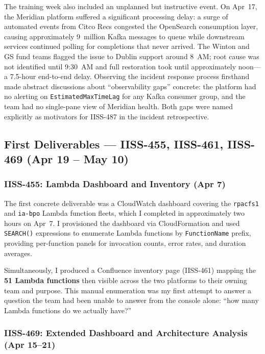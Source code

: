 The training week also included an unplanned but instructive event. On
Apr~17, the Meridian platform suffered a significant processing delay: a surge
of automated events from Citco Recs congested the OpenSearch consumption layer,
causing approximately 9~million Kafka messages to queue while downstream services
continued polling for completions that never arrived. The Winton and GS fund teams
flagged the issue to Dublin support around 8~AM; root cause was not identified until
9:30~AM and full restoration took until approximately noon---a 7.5-hour end-to-end
delay. Observing the incident response process firsthand made abstract discussions
about ``observability gaps'' concrete: the platform had no alerting on
\texttt{EstimatedMaxTimeLag} for any Kafka consumer group, and the team had no
single-pane view of Meridian health. Both gaps were named explicitly as motivators
for IISS-487 in the incident retrospective.

\subsection{First Deliverables --- IISS-455, IISS-461, IISS-469 (Apr 19 -- May 10)}

\subsubsection{IISS-455: Lambda Dashboard and Inventory (Apr 7)}

The first concrete deliverable was a CloudWatch dashboard covering the
\texttt{rpacfs1} and \texttt{ia-bpo} Lambda function fleets, which I completed in
approximately two hours on Apr~7. I provisioned the dashboard via
CloudFormation and used \texttt{SEARCH()} expressions to enumerate Lambda
functions by \texttt{FunctionName} prefix, providing per-function panels for
invocation counts, error rates, and duration averages.

Simultaneously, I produced a Confluence inventory page (IISS-461) mapping the
\textbf{51 Lambda functions} then visible across the two platforms to their
owning team and purpose. This manual enumeration was my first attempt to answer
a question the team had been unable to answer from the console alone: ``how many
Lambda functions do we actually have?''

\subsubsection{IISS-469: Extended Dashboard and Architecture Analysis (Apr 15--21)}

